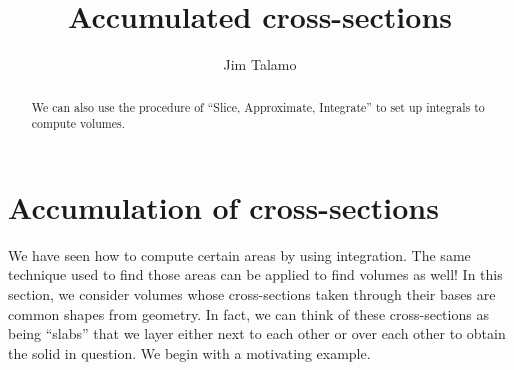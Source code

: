\documentclass{ximera}
\author{Jim Talamo}
\title[Dig-In:]{Accumulated cross-sections}
\begin{document}
\begin{abstract}
  We can also use the procedure of ``Slice, Approximate, Integrate'' to set up integrals to compute volumes.
\end{abstract}
\maketitle

\section{Accumulation of cross-sections}

We have seen how to compute certain areas by using integration. The
same technique used to find those areas can be applied to find volumes
as well! In this section, we consider volumes whose cross-sections
taken through their bases are common shapes from geometry.  In fact,
we can think of these cross-sections as being ``slabs'' that we layer
either next to each other or over each other to obtain the solid in
question. We begin with a
motivating example.



\end{document}
